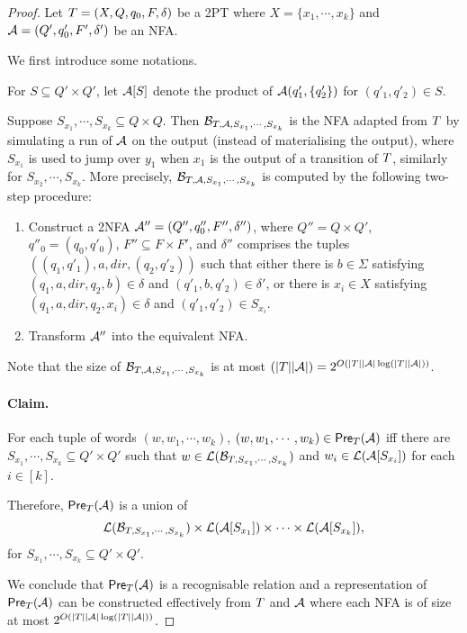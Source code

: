 \begin{proof}
Let $T=(X, Q, q_0, F, \delta)$ be a 2PT where $X = \{x_1,\cdots, x_k\}$ and $\mathcal{A}=(Q', q'_0, F', \delta')$ be an NFA.

We first introduce some notations.

For $S \subseteq Q' \times Q'$, let $\mathcal{A}[S]$ denote the product of $\mathcal{A}(q'_1, \{q'_2\})$ for $(q'_1,q'_2) \in S$. 

Suppose $S_{x_1}, \cdots, S_{x_k} \subseteq Q \times Q$. Then $\mathcal{B}_{T, \mathcal{A}, S_{x_1}, \cdots, S_{x_k}}$ is the NFA adapted from $T$  by simulating a run of $\mathcal{A}$ on the output (instead of materialising the output), where $S_{x_1}$ is used to jump over $y_1$ when $x_1$ is the output of a transition of $T$, similarly for $S_{x_2}, \cdots, S_{x_k}$. More precisely, $\mathcal{B}_{T, \mathcal{A}, S_{x_1}, \cdots, S_{x_k}}$ is computed by the following two-step procedure:
\begin{enumerate} 
\item Construct a 2NFA $\mathcal{A}'' = (Q'', q''_{0}, F'', \delta'')$, where $Q'' = Q \times Q'$, $q''_0 = (q_0, q'_0)$, $F'' \subseteq F \times F'$, and $\delta''$ comprises the tuples $((q_1, q'_1), a, dir, (q_2, q'_2))$ such that either there is $b \in \Sigma$ satisfying $(q_1, a, dir, q_2, b) \in \delta$ and $(q'_1, b, q'_2) \in \delta'$, or there is $x_i \in X$ satisfying $(q_1, a, dir, q_2, x_i) \in \delta$  and $(q'_1, q'_2) \in S_{x_i}$.
\item Transform $\mathcal{A}''$ into the equivalent NFA.
\end{enumerate} 
Note that the size of $\mathcal{B}_{T, \mathcal{A}, S_{x_1}, \cdots, S_{x_k}}$ is at most $(|T||\mathcal{A}|)=2^{O(|T||\mathcal{A}| \log(|T||\mathcal{A}|))}$.

\paragraph{Claim.} For each tuple of words $(w, w_1,\cdots, w_k)$, $(w, w_1,\cdots, w_k) \in \textsf{Pre}_{T}(\mathcal{A})$ iff there are $S_{x_1}, \cdots, S_{x_k} \subseteq Q' \times Q'$ such that $w \in \mathcal{L}(\mathcal{B}_{T, S_{x_1}, \cdots, S_{x_k}})$ and $w_i \in \mathcal{L}(\mathcal{A}[S_{x_i}])$ for each $i \in [k]$.

\medskip

Therefore, $\textsf{Pre}_{T}(\mathcal{A})$ is a union of
\[\mathcal{L}(\mathcal{B}_{T, S_{x_1}, \cdots, S_{x_k}}) \times \mathcal{L}(\mathcal{A}[S_{x_1}]) \times \cdots  \times \mathcal{L}(\mathcal{A}[S_{x_k}]), \]
for $S_{x_1}, \cdots, S_{x_k} \subseteq Q' \times Q'$. 

We conclude that $\textsf{Pre}_{T}(\mathcal{A})$ is a recognisable relation and a representation of $\textsf{Pre}_{T}(\mathcal{A})$ can be constructed effectively from $T$ and $\mathcal{A}$ where each NFA is of size at most $2^{O(|T||\mathcal{A}|\log (|T||\mathcal{A}|))}$.
\end{proof}


